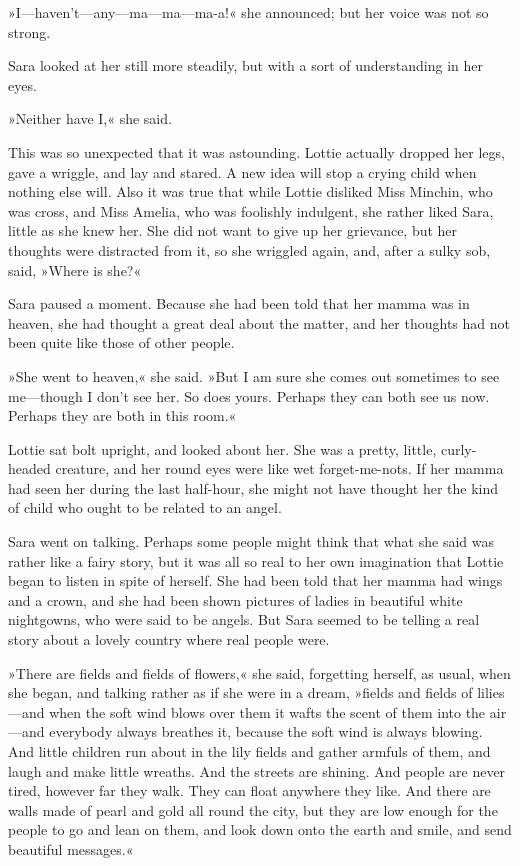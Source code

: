 »I—haven't—any—ma—ma—ma-a!« she announced; but her voice was not so strong.

Sara looked at her still more steadily, but with a sort of understanding in her eyes.

»Neither have I,« she said.

This was so unexpected that it was astounding. Lottie actually dropped her legs, gave a wriggle, and lay and stared. A new idea will stop a crying child when nothing else will. Also it was true that while Lottie disliked Miss Minchin, who was cross, and Miss Amelia, who was foolishly indulgent, she rather liked Sara, little as she knew her. She did not want to give up her grievance, but her thoughts were distracted from it, so she wriggled again, and, after a sulky sob, said, »Where is she?«

Sara paused a moment. Because she had been told that her mamma was in heaven, she had thought a great deal about the matter, and her thoughts had not been quite like those of other people.

»She went to heaven,« she said. »But I am sure she comes out sometimes to see me—though I don't see her. So does yours. Perhaps they can both see us now. Perhaps they are both in this room.«

Lottie sat bolt upright, and looked about her. She was a pretty, little, curly-headed creature, and her round eyes were like wet forget-me-nots. If her mamma had seen her during the last half-hour, she might not have thought her the kind of child who ought to be related to an angel.

Sara went on talking. Perhaps some people might think that what she said was rather like a fairy story, but it was all so real to her own imagination that Lottie began to listen in spite of herself. She had been told that her mamma had wings and a crown, and she had been shown pictures of ladies in beautiful white nightgowns, who were said to be angels. But Sara seemed to be telling a real story about a lovely country where real people were.

»There are fields and fields of flowers,« she said, forgetting herself, as usual, when she began, and talking rather as if she were in a dream, »fields and fields of lilies—and when the soft wind blows over them it wafts the scent of them into the air—and everybody always breathes it, because the soft wind is always blowing. And little children run about in the lily fields and gather armfuls of them, and laugh and make little wreaths. And the streets are shining. And people are never tired, however far they walk. They can float anywhere they like. And there are walls made of pearl and gold all round the city, but they are low enough for the people to go and lean on them, and look down onto the earth and smile, and send beautiful messages.«

